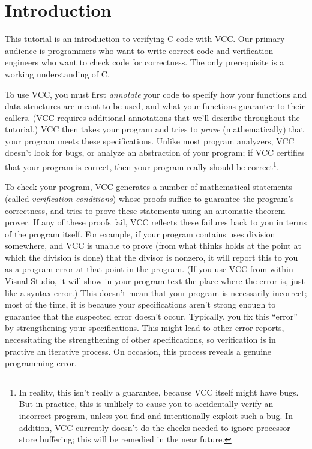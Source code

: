 \section{Introduction}
This tutorial is an introduction to verifying C code with VCC. Our
primary audience is programmers who want to write correct code and
verification engineers who want to check code for correctness. The
only prerequisite is a working understanding of C. 

To use VCC, you must first \emph{annotate} your code to specify how
your functions and data structures are meant to be used, and what your
functions guarantee to their callers. (VCC requires additional
annotations that we'll describe throughout the tutorial.) VCC then
takes your program and tries to \emph{prove} (mathematically) that
your program meets these specifications.  Unlike most program
analyzers, VCC doesn't look for bugs, or analyze an abstraction of
your program; if VCC certifies that your program is correct, then your
program really should be correct\footnote{In reality, this isn't
  really a guarantee, because VCC itself might have bugs. But in
  practice, this is unlikely to cause you to accidentally verify an
  incorrect program, unless you find and intentionally exploit such a
  bug. In addition, VCC currently doesn't do the checks needed to
  ignore processor store buffering; this will be remedied in the near
  future.}. 

To check your program, VCC generates a number of mathematical
statements (called \emph{verification conditions}) whose proofs
suffice to guarantee the program's correctness, and tries to prove
these statements using an automatic theorem prover. If any of these
proofs fail, VCC reflects these failures back to you in terms of the
program itself. For example, if your program contains uses division
somewhere, and VCC is unable to prove (from what thinks holds at the
point at which the division is done) that the divisor is nonzero, it
will report this to you as a program error at that point in the
program. (If you use VCC from within Visual Studio, it will show in
your program text the place where the error is, just like a syntax
error.) This doesn't mean that your program is necessarily incorrect;
most of the time, it is because your specifications aren't strong
enough to guarantee that the suspected error doesn't occur.
Typically, you fix this ``error'' by strengthening your
specifications. This might lead to other error reports, necessitating
the strengthening of other specifications, so verification is in
practive an iterative process. On occasion, this process reveals a
genuine programming error.

